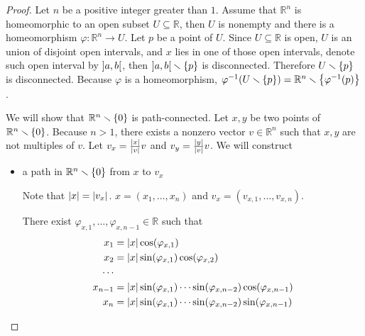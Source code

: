 \begin{proof}
	Let $n$ be a positive integer greater than $1$. Assume that $\mathbb{R}^{n}$ is homeomorphic to an open subset $U\subseteq \mathbb{R}$, then $U$ is nonempty and there is a homeomorphism $\varphi: \mathbb{R}^{n} \to U$. Let $p$ be a point of $U$. Since $U\subseteq \mathbb{R}$ is open, $U$ is an union of disjoint open intervals, and $x$ lies in one of those open intervals, denote such open interval by $\left]{a, b}\right[$, then $\left]{a, b}\right[\smallsetminus\left\{{p}\right\}$ is disconnected. Therefore $U\smallsetminus\left\{{p}\right\}$ is disconnected. Because $\varphi$ is a homeomorphism, $\varphi^{-1}(U\smallsetminus\left\{{p}\right\}) = \mathbb{R}^{n} \smallsetminus \left\{{\varphi^{-1}(p)}\right\}$.

	We will show that $\mathbb{R}^{n}\smallsetminus\left\{{0}\right\}$ is path-connected. Let $x, y$ be two points of $\mathbb{R}^{n}\smallsetminus\left\{{0}\right\}$. Because $n > 1$, there exists a nonzero vector $v\in \mathbb{R}^{n}$ such that $x, y$ are not multiples of $v$. Let $v_{x} = \frac{\left\vert{x}\right\vert}{\left\vert{v}\right\vert}v$ and $v_{y} = \frac{\left\vert{y}\right\vert}{\left\vert{v}\right\vert}v$. We will construct
	\begin{itemize}
		\item a path in $\mathbb{R}^{n}\smallsetminus\left\{{0}\right\}$ from $x$ to $v_{x}$

		      Note that $\left\vert{x}\right\vert = \left\vert{v_{x}}\right\vert$. $x = (x_{1}, \ldots, x_{n})$ and $v_{x} = (v_{x,1}, \ldots, v_{x,n})$.

		      There exist $\varphi_{x,1}, \ldots, \varphi_{x,n-1} \in \mathbb{R}$ such that
		      \begin{align*}
			      x_{1}   & = \left\vert{x}\right\vert\cos(\varphi_{x,1})                                                 \\
			      x_{2}   & = \left\vert{x}\right\vert\sin(\varphi_{x,1})\cos(\varphi_{x,2})                              \\
			      \cdots  &                                                                              \\
			      x_{n-1} & = \left\vert{x}\right\vert\sin(\varphi_{x,1})\cdots\sin(\varphi_{x,n-2})\cos(\varphi_{x,n-1}) \\
			      x_{n}   & = \left\vert{x}\right\vert\sin(\varphi_{x,1})\cdots\sin(\varphi_{x,n-2})\sin(\varphi_{x,n-1})
		      \end{align*}


\end{itemize}
\end{proof}
